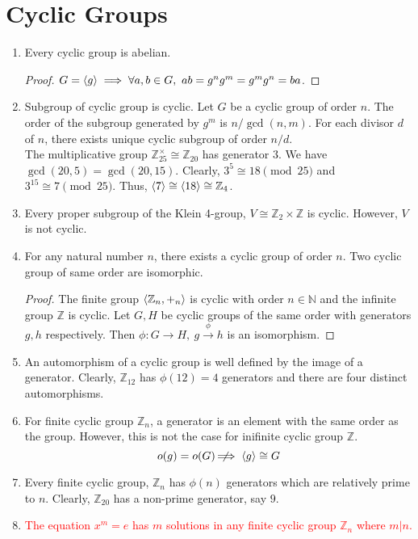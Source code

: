 \section{Cyclic Groups}
\begin{enumerate}
	\item Every cyclic group is abelian.
	\begin{proof}
		$G = \left\langle g \right\rangle \implies \forall a,b \in G,\ ab = g^ng^m = g^mg^n = ba$.
	\end{proof}
	\item Subgroup of cyclic group is cyclic. Let $G$ be a cyclic group of order $n$. The order of the subgroup generated by $g^m$ is $n/\gcd(n,m)$. For each divisor $d$ of $n$, there exists unique cyclic subgroup of order $n/d$.\\

	The multiplicative group $\mathbb{Z}_{25}^\times \cong \mathbb{Z}_{20}$ has generator $3$.
	We have $\gcd(20,5) = \gcd(20,15)$.
	Clearly, $3^5 \cong 18 \pmod{25}$ and $3^{15} \cong 7 \pmod{25}$. Thus, $\left\langle 7 \right\rangle \cong \left\langle 18 \right\rangle \cong \mathbb{Z}_4$.
	\item Every proper subgroup of the Klein 4-group, $V \cong \mathbb{Z}_2 \times \mathbb{Z}$ is cyclic. However, $V$ is not cyclic.
	\item For any natural number $n$, there exists a cyclic group of order $n$. Two cyclic group of same order are isomorphic.
	\begin{proof}
		The finite group $\left\langle \mathbb{Z}_n,+_n \right\rangle$ is cyclic with order $n \in \mathbb{N}$ and the infinite group $\mathbb{Z}$ is cyclic.
		Let $G,H$ be cyclic groups of the same order with generators $g,h$ respectively.
		Then $\phi : G \to H,\ g \overset{\phi}{\to} h$ is an isomorphism.
	\end{proof}
	\item An automorphism of a cyclic group is well defined by the image of a generator.
		Clearly, $\mathbb{Z}_{12}$ has $\phi(12)=4$ generators and there are four distinct automorphisms.
	\item For finite cyclic group $\mathbb{Z}_n$, a generator is an element with the same order as the group. However, this is not the case for inifinite cyclic group $\mathbb{Z}$.
		$$o(g) = o(G) \;\not\nobreak\!\!\!\!\implies \left\langle g \right\rangle \cong G$$
	\item Every finite cyclic group, $\mathbb{Z}_n$ has $\phi(n)$ generators which are relatively prime to $n$.
	Clearly, $\mathbb{Z}_{20}$ has a non-prime generator, say $9$.
	\item \textcolor{red}{The equation $x^m = e$ has $m$ solutions in any finite cyclic group $\mathbb{Z}_n$ where $m|n$.}

\end{enumerate}
